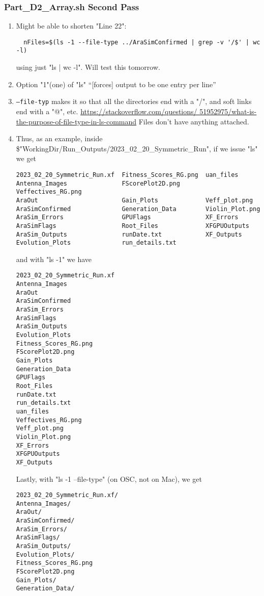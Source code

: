 \documentclass[12pt,letterpaper]{article}
\begin{document}
\subsubsection{Part\_D2\_Array.sh Second Pass}
\begin{enumerate}
  \item Might be able to shorten "Line 22":
    \begin{verbatim}
  nFiles=$(ls -1 --file-type ../AraSimConfirmed | grep -v '/$' | wc -l)
    \end{verbatim}
    using just "ls | wc -l". Will test this tomorrow.
  \item Option "1"(one) of "ls" ``[forces] output to be one entry per line''
  \item \texttt{--file-typ} makes it so that all the directories end with a "/", and
    soft links end with a "@", etc. \url{https://stackoverflow.com/questions/
    51952975/what-is-the-purpose-of-file-type-in-ls-command}
    Files don't have anything attached.
  \item Thus, as an example, inside \$"WorkingDir/Run_Outputs/2023_02_20_Symmetric_Run",
    if we issue "ls" we get
    \begin{verbatim}
2023_02_20_Symmetric_Run.xf  Fitness_Scores_RG.png  uan_files
Antenna_Images               FScorePlot2D.png       Veffectives_RG.png
AraOut                       Gain_Plots             Veff_plot.png
AraSimConfirmed              Generation_Data        Violin_Plot.png
AraSim_Errors                GPUFlags               XF_Errors
AraSimFlags                  Root_Files             XFGPUOutputs
AraSim_Outputs               runDate.txt            XF_Outputs
Evolution_Plots              run_details.txt
    \end{verbatim}
    and with "ls -1" we have
    \begin{verbatim}
2023_02_20_Symmetric_Run.xf
Antenna_Images
AraOut
AraSimConfirmed
AraSim_Errors
AraSimFlags
AraSim_Outputs
Evolution_Plots
Fitness_Scores_RG.png
FScorePlot2D.png
Gain_Plots
Generation_Data
GPUFlags
Root_Files
runDate.txt
run_details.txt
uan_files
Veffectives_RG.png
Veff_plot.png
Violin_Plot.png
XF_Errors
XFGPUOutputs
XF_Outputs
    \end{verbatim}
    Lastly, with "ls -1 --file-type" (on OSC, not on Mac), we get
    \begin{verbatim}
2023_02_20_Symmetric_Run.xf/
Antenna_Images/
AraOut/
AraSimConfirmed/
AraSim_Errors/
AraSimFlags/
AraSim_Outputs/
Evolution_Plots/
Fitness_Scores_RG.png
FScorePlot2D.png
Gain_Plots/
Generation_Data/

\end{verbatim}
\end{enumerate}
\end{document}
